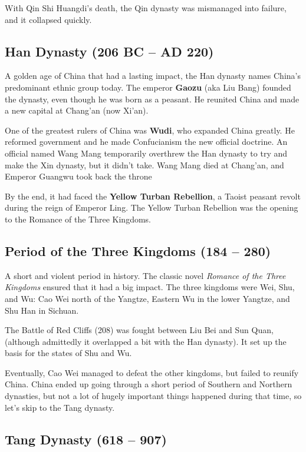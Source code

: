 With Qin Shi Huangdi's death, the Qin dynasty was mismanaged into failure, and it collapsed quickly.

\subsection*{Han Dynasty (206 BC -- AD 220)}

A golden age of China that had a lasting impact, the Han dynasty names China's predominant ethnic group today.
The emperor \textbf{Gaozu} (aka Liu Bang) founded the dynasty, even though he was born as a peasant.
He reunited China and made a new capital at Chang'an (now Xi'an).

One of the greatest rulers of China was \textbf{Wudi}, who expanded China greatly.
He reformed government and he made Confucianism the new official doctrine.
An official named Wang Mang temporarily overthrew the Han dynasty
to try and make the Xin dynasty, but it didn't take.
Wang Mang died at Chang'an, and Emperor Guangwu took back the throne

By the end, it had faced the \textbf{Yellow Turban Rebellion},
a Taoist peasant revolt during the reign of Emperor Ling.
The Yellow Turban Rebellion was the opening to the Romance of the Three Kingdoms.

\subsection*{Period of the Three Kingdoms (184 -- 280)}

A short and violent period in history.
The classic novel \textit{Romance of the Three Kingdoms} ensured that it had a big impact.
The three kingdoms were Wei, Shu, and Wu:
Cao Wei north of the Yangtze,
Eastern Wu in the lower Yangtze,
and Shu Han in Sichuan.

The Battle of Red Cliffs (208) was fought between Liu Bei and Sun Quan,
(although admittedly it overlapped a bit with the Han dynasty).
It set up the basis for the states of Shu and Wu.

Eventually, Cao Wei managed to defeat the other kingdoms, but failed to reunify China.
China ended up going through a short period of Southern and Northern dynasties,
but not a lot of hugely important things happened during that time, so let's skip to the Tang dynasty.

\subsection*{Tang Dynasty (618 -- 907)}

